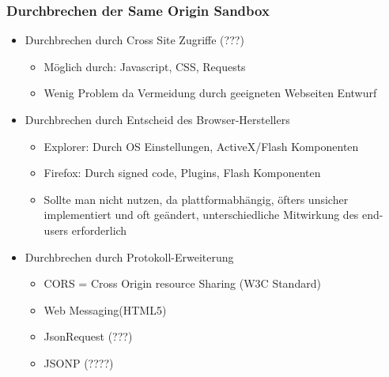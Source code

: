 \documentclass{article} %
\begin{document}
	\subsubsection{Durchbrechen der Same Origin Sandbox}
	\begin{itemize}
		\item Durchbrechen durch Cross Site Zugriffe (???)
		\begin{itemize} 
			\item Möglich durch: Javascript, CSS, Requests
			\item Wenig Problem da Vermeidung durch geeigneten Webseiten Entwurf
		\end{itemize}
		\item Durchbrechen durch Entscheid des Browser-Herstellers
		\begin{itemize}
			\item Explorer: Durch OS Einstellungen, ActiveX/Flash Komponenten
			\item Firefox: Durch signed code, Plugins, Flash Komponenten
			\item Sollte man nicht nutzen, da plattformabhängig, öfters unsicher implementiert und
			oft geändert, unterschiedliche Mitwirkung des end-users erforderlich
		\end{itemize}
		\item Durchbrechen durch Protokoll-Erweiterung
		\begin{itemize}
			\item CORS = Cross Origin resource Sharing (W3C Standard)
			\item Web Messaging(HTML5)
			\item JsonRequest (???)
			\item JSONP (????)
		\end{itemize}
	\end{itemize}
\end{document}
